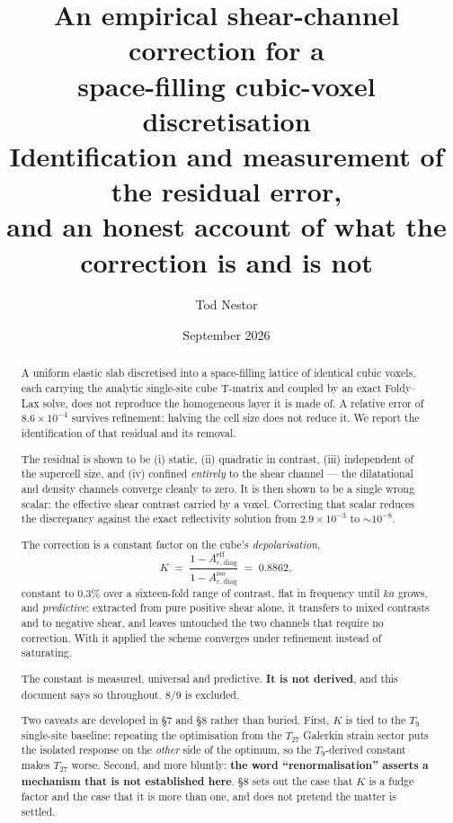 \documentclass[11pt,a4paper]{article}
\title{An empirical shear-channel correction for a\\
space-filling cubic-voxel discretisation\\[6pt]
\large Identification and measurement of the residual error,\\
and an honest account of what the correction is and is not}
\author{Tod Nestor}
\date{September 2026}
\newcommand{\Kren}{K}
\begin{document}
\maketitle

\begin{abstract}
A uniform elastic slab discretised into a space-filling lattice of identical
cubic voxels, each carrying the analytic single-site cube T-matrix and coupled by
an exact Foldy--Lax solve, does not reproduce the homogeneous layer it is made
of. A relative error of $8.6\times10^{-4}$ survives refinement: halving the cell
size does not reduce it. We report the identification of that residual and its
removal.

The residual is shown to be (i) static, (ii) quadratic in contrast, (iii)
independent of the supercell size, and (iv) confined \emph{entirely} to the shear
channel --- the dilatational and density channels converge cleanly to zero. It is
then shown to be a single wrong scalar: the effective shear contrast carried by a
voxel. Correcting that scalar reduces the discrepancy against the exact
reflectivity solution from $2.9\times10^{-3}$ to $\sim\!10^{-8}$.

The correction is a constant factor on the cube's \emph{depolarisation},
\[
  \Kren \;=\; \frac{1-A^{\text{eff}}_{\varepsilon,\text{diag}}}
                   {1-A^{\text{iso}}_{\varepsilon,\text{diag}}}
        \;=\; 0.8862 ,
\]
constant to $0.3\%$ over a sixteen-fold range of contrast, flat in frequency
until $ka$ grows, and \emph{predictive}: extracted from pure positive shear
alone, it transfers to mixed contrasts and to negative shear, and leaves
untouched the two channels that require no correction. With it applied the
scheme converges under refinement instead of saturating.

The constant is measured, universal and predictive. \textbf{It is not derived},
and this document says so throughout. $8/9$ is excluded.

Two caveats are developed in \S7 and \S8 rather than buried. First, $\Kren$ is
tied to the $T_9$ single-site baseline: repeating the optimisation from the
$T_{27}$ Galerkin strain sector puts the isolated response on the \emph{other}
side of the optimum, so the $T_9$-derived constant makes $T_{27}$ worse. Second,
and more bluntly: \textbf{the word ``renormalisation'' asserts a mechanism that
is not established here}. \S8 sets out the case that $\Kren$ is a fudge factor
and the case that it is more than one, and does not pretend the matter is
settled.
\end{abstract}
\end{document}
